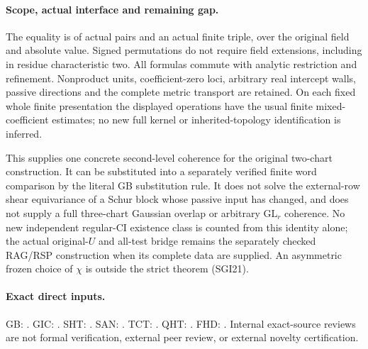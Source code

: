 \paragraph{Scope, actual interface and remaining gap.}
The equality is of actual pairs and an actual finite triple, over
the original field and absolute value.  Signed permutations do
not require field extensions, including in residue characteristic
two.  All formulas commute with analytic restriction and
refinement.  Nonproduct units, coefficient-zero loci, arbitrary
real intercept walls, passive directions and the complete metric
transport are retained.  On each fixed whole finite presentation
the displayed operations have the usual finite mixed-coefficient
estimates; no new full kernel or inherited-topology identification
is inferred.

This supplies one concrete second-level coherence for the original
two-chart construction.  It can be substituted into a separately
verified finite word comparison by the literal GB substitution rule.
It does not solve the external-row shear equivariance of a Schur
block whose passive input has changed, and does not supply a full
three-chart Gaussian overlap or arbitrary $\mathrm{GL}_r$ coherence.
No new independent regular-CI existence class is counted from this
identity alone; the actual original-$U$ and all-test bridge remains
the separately checked RAG/RSP construction when its complete data
are supplied.  An asymmetric frozen choice of $\chi$ is outside
the strict theorem (SGI21).

\paragraph{Exact direct inputs.}
GB: .
GIC: .
SHT: .
SAN: .
TCT: .
QHT: .
FHD: .
Internal exact-source reviews are not formal verification, external
peer review, or external novelty certification.
